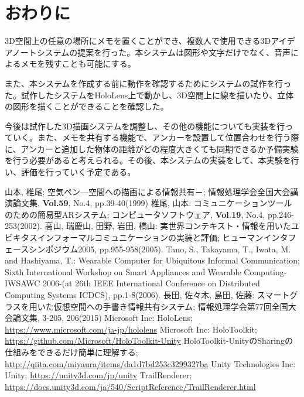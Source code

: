 \documentclass{hissymp}
\begin{document}
\section{おわりに}
3D空間上の任意の場所にメモを置くことができ、複数人で使用できる3Dアイデアノートシステムの提案を行った。本システムは図形や文字だけでなく、音声によるメモを残すことも可能にする。

また、本システムを作成する前に動作を確認するためにシステムの試作を行った。試作したシステムをHoloLens上で動かし、3D空間上に線を描いたり、立体の図形を描くことができることを確認した。

今後は試作した3D描画システムを調整し、その他の機能についても実装を行っていく。また、メモを共有する機能で、アンカーを設置して位置合わせを行う際に、アンカーと追加した物体の距離がどの程度大きくても同期できるか予備実験を行う必要があると考えられる。その後、本システムの実装をして、本実験を行い、評価を行っていく予定である。


\begin{thebibliography}{99}
        山本, 椎尾:
        空気ペン―空間への描画による情報共有－;
        情報処理学会全国大会講演論文集,
        {\bf Vol.59}, No.4, pp.39-40(1999)
	椎尾, 山本:
	コミュニケーションツールのための簡易型ARシステム;
	コンピュータソフトウェア, 
        {\bf Vol.19}, No.4, pp.246-253(2002).
	高山, 瑞慶山, 田野, 岩田, 橋山:
	実世界コンテキスト・情報を用いたユビキタスインフォーマルコミュニケーションの実装と評価;
	ヒューマンインタフェースシンポジウム2005,
        pp.955-958(2005).
        Tano, S., Takayama, T., Iwata, M. and Hashiyama, T.:
        Wearable Computer for Ubiquitous Informal Communication;
        Sixth International Workshop on Smart Appliances and Wearable Computing-IWSAWC 2006-(at 26th IEEE International Conference on Distributed Computing Systems ICDCS),
        pp.1-8(2006).
        長田, 佐々木, 島田, 佐藤:
        スマートグラスを用いた仮想空間への手書き情報共有システム;
        情報処理学会第77回全国大会論文集,
        3-205, 206(2015)
        Microsoft Inc:
        HoloLens;
        \url{https://www.microsoft.com/ja-jp/hololens}
        Microsoft Inc:
        HoloToolkit;
        \url{https://github.com/Microsoft/HoloToolkit-Unity}
        HoloToolkit-UnityのSharingの仕組みをできるだけ簡単に理解する; 
        \url{http://qiita.com/miyaura/items/da1d7bd253c3299327ba}
        Unity Technologies Inc:
        Unity;
        \url{https://unity3d.com/jp/unity}
        TrailRenderer;
        \url{https://docs.unity3d.com/ja/540/ScriptReference/TrailRenderer.html}

\end{thebibliography}
\end{document}
